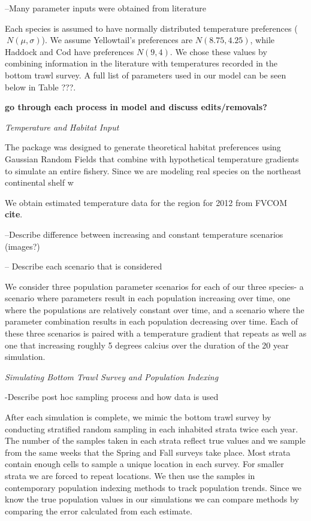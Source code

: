 \documentclass[
  12pt,
]{article}
\begin{document}
--Many parameter inputs were obtained from literature

Each species is assumed to have normally distributed temperature preferences (\(~N(\mu,\sigma)\)). We assume Yellowtail's preferences are \(N(8.75,4.25)\), while Haddock and Cod have preferences \(N(9,4)\). We chose these values by combining information in the literature with temperatures recorded in the bottom trawl survey. A full list of parameters used in our model can be seen below in Table ???.

\textbf{go through each process in model and discuss edits/removals?}

\emph{Temperature and Habitat Input}

The package was designed to generate theoretical habitat preferences using Gaussian Random Fields that combine with hypothetical temperature gradients to simulate an entire fishery. Since we are modeling real species on the northeast continental shelf w

We obtain estimated temperature data for the region for 2012 from FVCOM \textbf{cite}.

--Describe difference between increasing and constant temperature scenarios (images?)

-- Describe each scenario that is considered

We consider three population parameter scenarios for each of our three species- a scenario where parameters result in each population increasing over time, one where the populations are relatively constant over time, and a scenario where the parameter combination results in each population decreasing over time. Each of these three scenarios is paired with a temperature gradient that repeats as well as one that increasing roughly 5 degrees calcius over the duration of the 20 year simulation.

\emph{Simulating Bottom Trawl Survey and Population Indexing}

-Describe post hoc sampling process and how data is used

After each simulation is complete, we mimic the bottom trawl survey by conducting stratified random sampling in each inhabited strata twice each year. The number of the samples taken in each strata reflect true values and we sample from the same weeks that the Spring and Fall surveys take place. Most strata contain enough cells to sample a unique location in each survey. For smaller strata we are forced to repeat locations. We then use the samples in contemporary population indexing methods to track population trends. Since we know the true population values in our simulations we can compare methods by comparing the error calculated from each estimate.
\end{document}
